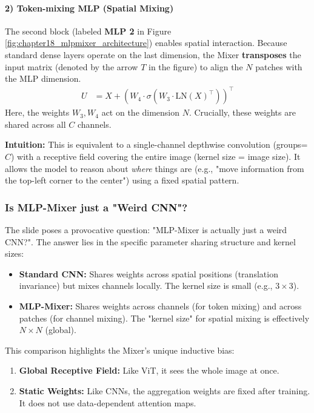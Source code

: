\paragraph{2) Token-mixing MLP (Spatial Mixing)}
\noindent
The second block (labeled \textbf{MLP 2} in Figure \ref{fig:chapter18_mlpmixer_architecture}) enables spatial interaction. Because standard dense layers operate on the last dimension, the Mixer \textbf{transposes} the input matrix (denoted by the arrow $T$ in the figure) to align the $N$ patches with the MLP dimension.
\begin{align}
	U &= X + (W_4 \cdot \sigma(W_3 \cdot \text{LN}(X)^\top))^\top \label{eq:token_mix}
\end{align}
Here, the weights $W_3, W_4$ act on the dimension $N$. Crucially, these weights are shared across all $C$ channels.

\noindent
\textbf{Intuition:} This is equivalent to a single-channel depthwise convolution (groups=$C$) with a receptive field covering the entire image (kernel size = image size). It allows the model to reason about \emph{where} things are (e.g., "move information from the top-left corner to the center") using a fixed spatial pattern.

\subsubsection{Is MLP-Mixer just a "Weird CNN"?}
\noindent
The slide poses a provocative question: "MLP-Mixer is actually just a weird CNN?". The answer lies in the specific parameter sharing structure and kernel sizes:

\begin{itemize}
	\item \textbf{Standard CNN:} Shares weights across spatial positions (translation invariance) but mixes channels locally. The kernel size is small (e.g., $3 \times 3$).
	\item \textbf{MLP-Mixer:} Shares weights across channels (for token mixing) and across patches (for channel mixing). The "kernel size" for spatial mixing is effectively $N \times N$ (global).
\end{itemize}

\noindent
This comparison highlights the Mixer's unique inductive bias:
\begin{enumerate}
	\item \textbf{Global Receptive Field:} Like ViT, it sees the whole image at once.
	\item \textbf{Static Weights:} Like CNNs, the aggregation weights are fixed after training. It does not use data-dependent attention maps.
\end{enumerate}


